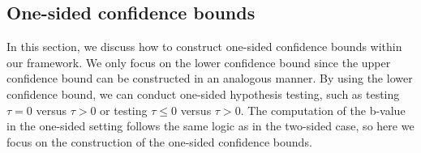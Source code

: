 \documentclass[11pt]{article}
\def\given{\,|\,}
\def\P{{\mathrm P}}
\newcommand{\htau}{\widehat\tau}
\numberwithin{equation}{section}
\theoremstyle{definition}
\begin{document}




\subsection{One-sided confidence bounds}\label{sec:one_sided}


In this section, we discuss how to construct one-sided confidence bounds within our framework. We only focus on the lower confidence bound since the upper confidence bound can be constructed in an analogous manner. By using the lower confidence bound, we can conduct one-sided hypothesis testing, such as testing $\tau = 0$ versus $\tau > 0$ or testing $\tau \le 0$ versus $\tau > 0$. The computation of the b-value in the one-sided setting follows the same logic as in the two-sided case, so here we focus on the construction of the one-sided confidence bounds.
\end{document}
